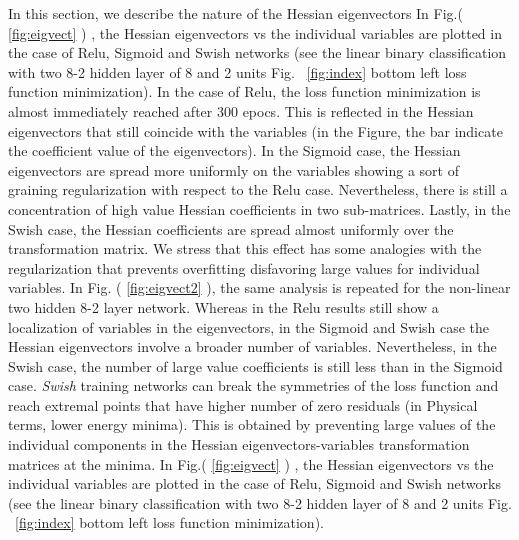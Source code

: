 \documentclass{article}
\begin{document}
In this section, we describe the nature of the Hessian eigenvectors
In Fig.( \ref{fig:eigvect} ) , the Hessian eigenvectors vs the individual variables are plotted in the case of Relu, Sigmoid and Swish networks (see the linear binary classification with two 8-2 hidden layer of 8 and 2 units Fig. ~\eqref{fig:index} bottom left loss function minimization). In the case of Relu, the loss function minimization is almost immediately reached after 300 epocs. This is reflected in the Hessian eigenvectors that still coincide with the variables (in the Figure, the bar indicate the coefficient value of the eigenvectors). In the Sigmoid case, the Hessian eigenvectors are spread more uniformly on the variables showing a sort of graining regularization with respect to the Relu case. Nevertheless, there is still a concentration of high value Hessian coefficients in two sub-matrices. Lastly, in the Swish case, the Hessian coefficients are spread almost uniformly over the transformation matrix. We stress that this effect has some analogies with the regularization that prevents overfitting disfavoring large values for individual variables.
In Fig. ( \ref{fig:eigvect2} ), the same analysis is repeated for the non-linear two hidden 8-2 layer network. Whereas in the Relu results still show a localization of variables in the eigenvectors, in the Sigmoid and Swish case the Hessian eigenvectors involve a broader number of variables. Nevertheless, in the Swish case, the number of large value coefficients is still less than in the Sigmoid case.
{\it Swish} training networks can break the symmetries of the loss function and reach extremal points that have higher number of zero residuals (in Physical terms, lower energy minima).
This is obtained by preventing large values of the individual components in the Hessian eigenvectors-variables transformation matrices at the minima. In Fig.( \ref{fig:eigvect} ) , the Hessian eigenvectors vs the individual variables are plotted in the case of Relu, Sigmoid and Swish networks (see the linear binary classification with two 8-2 hidden layer of 8 and 2 units Fig. ~\eqref{fig:index} bottom left loss function minimization).
%
%
\end{document}
